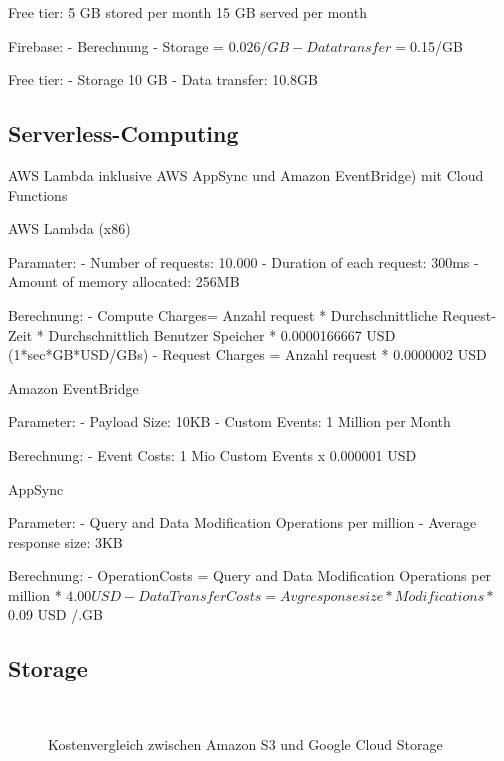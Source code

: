 Free tier:
5 GB stored per month
15 GB served per month

Firebase:
- Berechnung
    - Storage = $0.026/GB
    - Data transfer = $0.15/GB

Free tier:
- Storage 10 GB
- Data transfer: 10.8GB








\subsection{Serverless-Computing}

AWS Lambda inklusive AWS AppSync und Amazon EventBridge) mit Cloud Functions

AWS Lambda (x86)

  Paramater:
  - Number of requests: 10.000
  - Duration of each request: 300ms
  - Amount of memory allocated: 256MB

  Berechnung:
  - Compute Charges= Anzahl request * Durchschnittliche Request-Zeit * Durchschnittlich Benutzer Speicher * 0.0000166667 USD (1*sec*GB*USD/GBs)
  - Request Charges = Anzahl request * 0.0000002 USD

  Amazon EventBridge

  Parameter:
  - Payload Size: 10KB
  - Custom Events: 1 Million per Month

  Berechnung:
  - Event Costs: 1 Mio Custom Events x 0.000001 USD

  AppSync

  Parameter:
  - Query and Data Modification Operations per million
  - Average response size: 3KB

  Berechnung:
  - OperationCosts = Query and Data Modification Operations per million * $4.00 USD
  - Data Transfer Costs = Avg response size * Modifications * $0.09 USD /.GB



\subsection{Storage}

\begin{figure}[!ht]
  \centering
  \quad
  \\
  \quad
  \caption{Kostenvergleich zwischen Amazon S3 und Google Cloud Storage}
  \label{kostenvergleichStorage}
\end{figure}


